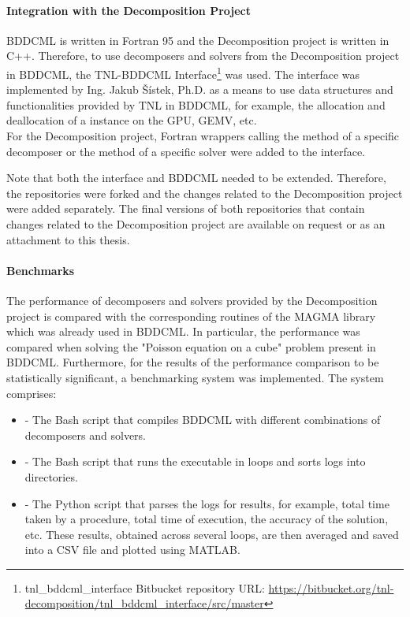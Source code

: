 \paragraph{Integration with the Decomposition Project} BDDCML is written in Fortran 95 and the Decomposition project is written in C++. Therefore, to use decomposers and solvers from the Decomposition project in BDDCML, the TNL-BDDCML Interface\footnote{tnl\_bddcml\_interface Bitbucket repository URL: \url{https://bitbucket.org/tnl-decomposition/tnl_bddcml_interface/src/master}} was used. The interface was implemented by Ing. Jakub Šístek, Ph.D. as a means to use data structures and functionalities provided by TNL in BDDCML, for example, the allocation and deallocation of a  instance on the GPU, GEMV, etc.\\
For the Decomposition project, Fortran wrappers calling the  method of a specific decomposer or the  method of a specific solver were added to the interface.

Note that both the interface and BDDCML needed to be extended. Therefore, the repositories were forked and the changes related to the Decomposition project were added separately. The final versions of both repositories that contain changes related to the Decomposition project are available on request or as an attachment to this thesis.

\paragraph{Benchmarks} The performance of decomposers and solvers provided by the Decomposition project is compared with the corresponding routines of the MAGMA library \cite{Tomov2010} which was already used in BDDCML. In particular, the performance was compared when solving the "Poisson equation on a cube" problem present in BDDCML. Furthermore, for the results of the performance comparison to be statistically significant, a benchmarking system was implemented. The system comprises:

\begin{itemize}
	\item {} - The Bash script that compiles BDDCML with different combinations of decomposers and solvers.
	\item {} - The Bash script that runs the  executable in loops and sorts logs into directories.
	\item {} - The Python script that parses the logs for results, for example, total time taken by a procedure, total time of execution, the accuracy of the solution, etc. These results, obtained across several loops, are then averaged and saved into a CSV file and plotted using MATLAB.
\end{itemize}